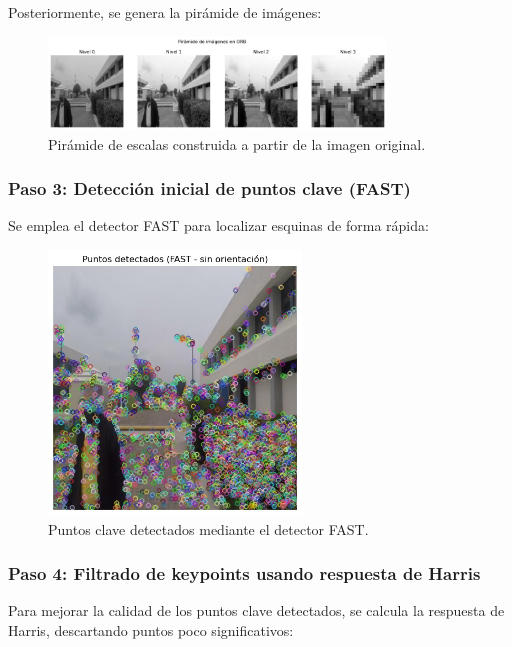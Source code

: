\documentclass[a4paper]{article}
\begin{document}
Posteriormente, se genera la pirámide de imágenes:

\begin{figure}[H]
    \centering
    \includegraphics[width=0.8\textwidth]{images/piramide_orb.jpg}
    \caption{Pirámide de escalas construida a partir de la imagen original.}
\end{figure}

\subsubsection*{Paso 3: Detección inicial de puntos clave (FAST)}

Se emplea el detector FAST para localizar esquinas de forma rápida:

\begin{figure}[H]
    \centering
    \includegraphics[width=0.6\textwidth]{images/fast_keypoints.jpg}
    \caption{Puntos clave detectados mediante el detector FAST.}
\end{figure}

\subsubsection*{Paso 4: Filtrado de keypoints usando respuesta de Harris}

Para mejorar la calidad de los puntos clave detectados, se calcula la respuesta de Harris, descartando puntos poco significativos:
\end{document}
